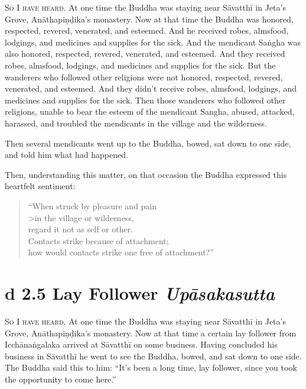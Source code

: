 \documentclass[12pt,openany]{book}%
\newcommand*{\suttatitleacronym}[1]{\smaller[2]{#1}\vspace*{.3em}}
\newcommand*{\suttatitletranslation}[1]{\linebreak{#1}}
\newcommand*{\suttatitleroot}[1]{\linebreak\smaller[2]\itshape{#1}}
\newcommand*{\tocacronym}[1]{\hspace*{-3.3em}{#1}\quad}
\newcommand*{\toctranslation}[1]{#1}
\newcommand*{\tocroot}[1]{(\textit{#1})}
\newcommand*{\scevam}[1]{\textsc{#1}}
\begin{document}
\scevam{So I have heard. }At one time the Buddha was staying near \textsanskrit{Sāvatthī} in Jeta’s Grove, \textsanskrit{Anāthapiṇḍika}’s monastery. Now at that time the Buddha was honored, respected, revered, venerated, and esteemed. And he received robes, almsfood, lodgings, and medicines and supplies for the sick. And the mendicant \textsanskrit{Saṅgha} was also honored, respected, revered, venerated, and esteemed. And they received robes, almsfood, lodgings, and medicines and supplies for the sick. But the wanderers who followed other religions were not honored, respected, revered, venerated, and esteemed. And they didn’t receive robes, almsfood, lodgings, and medicines and supplies for the sick. Then those wanderers who followed other religions, unable to bear the esteem of the mendicant Sangha, abused, attacked, harassed, and troubled the mendicants in the village and the wilderness. 

Then several mendicants went up to the Buddha, bowed, sat down to one side, and told him what had happened. 

Then, understanding this matter, on that occasion the Buddha expressed this heartfelt sentiment: 

\begin{verse}%
“When struck by pleasure and pain \\>in the village or wilderness, \\
regard it not as self or other. \\
Contacts strike because of attachment; \\
how would contacts strike one free of attachment?” 

%
\end{verse}

%
\section*{{\suttatitleacronym Ud 2.5}{\suttatitletranslation A Lay Follower }{\suttatitleroot Upāsakasutta}}
\addcontentsline{toc}{section}{\tocacronym{Ud 2.5} \toctranslation{A Lay Follower } \tocroot{Upāsakasutta}}

\scevam{So I have heard. }At one time the Buddha was staying near \textsanskrit{Sāvatthī} in Jeta’s Grove, \textsanskrit{Anāthapiṇḍika}’s monastery. Now at that time a certain lay follower from \textsanskrit{Icchānaṅgalaka} arrived at \textsanskrit{Sāvatthī} on some business. Having concluded his business in \textsanskrit{Sāvatthī} he went to see the Buddha, bowed, and sat down to one side. The Buddha said this to him: “It’s been a long time, lay follower, since you took the opportunity to come here.” 
\end{document}
